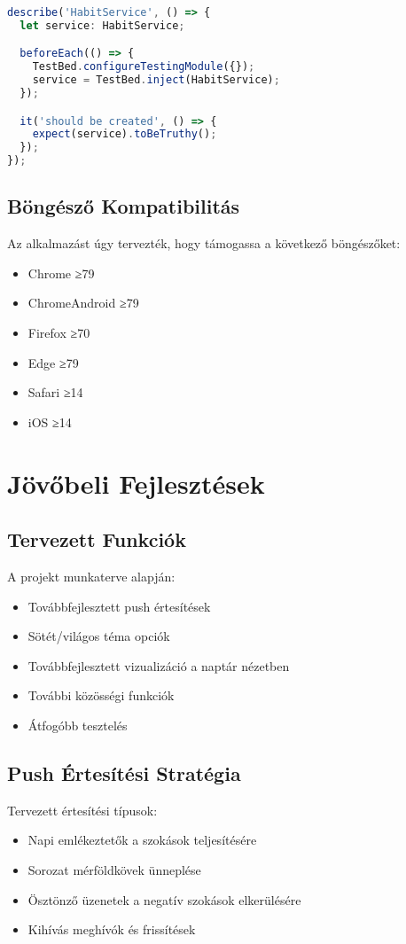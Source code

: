 \documentclass[12pt,a4paper]{report}
\begin{document}
\begin{lstlisting}[language=typescript]
describe('HabitService', () => {
  let service: HabitService;

  beforeEach(() => {
    TestBed.configureTestingModule({});
    service = TestBed.inject(HabitService);
  });

  it('should be created', () => {
    expect(service).toBeTruthy();
  });
});
\end{lstlisting}

\section{Böngésző Kompatibilitás}
Az alkalmazást úgy tervezték, hogy támogassa a következő böngészőket:
\begin{itemize}
    \item Chrome ≥79
    \item ChromeAndroid ≥79
    \item Firefox ≥70
    \item Edge ≥79
    \item Safari ≥14
    \item iOS ≥14
\end{itemize}

\chapter{Jövőbeli Fejlesztések}

\section{Tervezett Funkciók}
A projekt munkaterve alapján:
\begin{itemize}
    \item Továbbfejlesztett push értesítések
    \item Sötét/világos téma opciók
    \item Továbbfejlesztett vizualizáció a naptár nézetben
    \item További közösségi funkciók
    \item Átfogóbb tesztelés
\end{itemize}

\section{Push Értesítési Stratégia}
Tervezett értesítési típusok:
\begin{itemize}
    \item Napi emlékeztetők a szokások teljesítésére
    \item Sorozat mérföldkövek ünneplése
    \item Ösztönző üzenetek a negatív szokások elkerülésére
    \item Kihívás meghívók és frissítések
\end{itemize}
\end{document}

